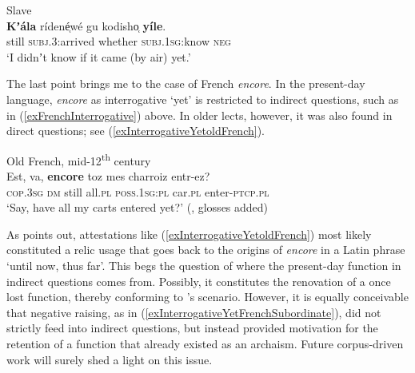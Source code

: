 \begin{exe}
		\ex Slave\label{exInterrogativeYetSlave4}\\
		\gll \textbf{Kʼála} rídené̜wé gu kodisho̜ \textbf{yíle}.\\
		still \textsc{subj}.3:arrived whether \textsc{subj}.1\textsc{sg}:know \textsc{neg}\\
		\glt \lq I didnʼt know if it came (by air) yet.' \parencite[1250]{Rice1989}
\end{exe}

The last point brings me to the case of French \textit{encore}. In the present-day language, \textit{encore} as interrogative \lq yet\rq{ }is restricted to indirect questions, such as in (\ref{exFrenchInterrogative}) above. In older lects, however, it was also found in direct questions; see (\ref{exInterrogativeYetoldFrench}).

\begin{exe}
	\ex Old French, mid-12\textsuperscript{th} century\label{exInterrogativeYetoldFrench}\\
	\gll Est, va, \textbf{encore} toz mes charroiz entr-ez?\\
	\textsc{cop}.3\textsc{sg} \textsc{dm} still all.\textsc{pl} \textsc{poss}.1\textsc{sg}:\textsc{pl} car.\textsc{pl} enter-\textsc{ptcp}.\textsc{pl}\\
	\glt \lq Say, have all my carts entered yet?\rq{ }(\cite[144]{MosegaardHansen2008}, glosses added)
\end{exe}

As \textcite[144]{MosegaardHansen2008} points out, attestations like (\ref{exInterrogativeYetoldFrench}) most likely constituted a relic usage that goes back to the origins of \textit{encore} in a Latin phrase \lq until now, thus far'. This begs the question of where the present-day function in indirect questions comes from. Possibly, it constitutes the renovation of a once lost function, thereby conforming to \citeauthor{vanderAuwera1998}'s scenario. However, it is equally conceivable that negative raising, as in (\ref{exInterrogativeYetFrenchSubordinate}), did not strictly feed into indirect questions, but instead provided motivation for the retention of a function that already existed as an archaism. Future corpus-driven work will surely shed a light on this issue.


